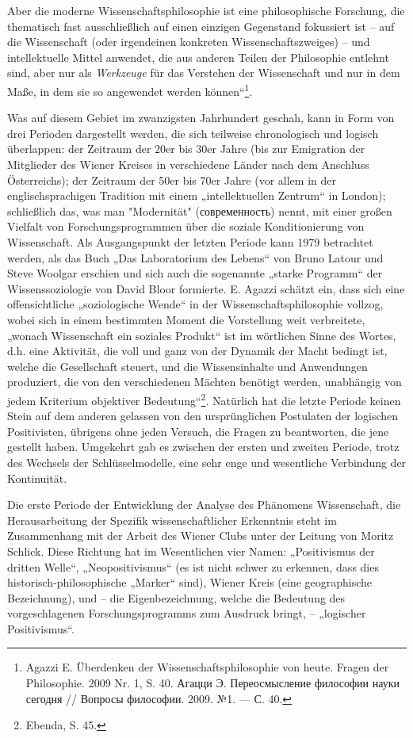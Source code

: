 \documentclass[11pt,a4paper]{article}
\begin{document}
Aber die moderne Wissenschaftsphilosophie ist eine philosophische Forschung,
die thematisch fast ausschließlich auf einen einzigen Gegenstand fokussiert
ist -- auf die Wissenschaft (oder irgendeinen konkreten Wissenschaftszweiges)
-- und intellektuelle Mittel anwendet, die aus anderen Teilen der Philosophie
entlehnt sind, aber nur als \emph{Werkzeuge} für das Verstehen der
Wissenschaft und nur in dem Maße, in dem sie so angewendet werden
können“\footnote{Agazzi E. Überdenken der Wissenschaftsphilosophie von heute.
  Fragen der Philosophie. 2009 Nr. 1, S. 40. \foreignlanguage{russian}{Агацци
    Э.  Переосмысление философии науки сегодня // Вопросы философии. 2009.
    №1. — С. 40.}}.

Was auf diesem Gebiet im zwanzigsten Jahrhundert geschah, kann in Form von
drei Perioden dargestellt werden, die sich teilweise chronologisch und logisch
überlappen: der Zeitraum der 20er bis 30er Jahre (bis zur Emigration der
Mitglieder des Wiener Kreises in verschiedene Länder nach dem Anschluss
Österreichs); der Zeitraum der 50er bis 70er Jahre (vor allem in der
englischsprachigen Tradition mit einem „intellektuellen Zentrum“ in London);
schließlich das, was man "Modernität"
(\foreignlanguage{russian}{современность}) nennt, mit einer großen Vielfalt
von Forschungsprogrammen über die soziale Konditionierung von Wissenschaft.
Als Ausgangspunkt der letzten Periode kann 1979 betrachtet werden, als das
Buch „Das Laboratorium des Lebens“ von Bruno Latour und Steve Woolgar erschien
und sich auch die sogenannte „starke Programm“ der Wissenssoziologie von David
Bloor formierte. E. Agazzi schätzt ein, dass sich eine offensichtliche
„soziologische Wende“ in der Wissenschaftsphilosophie vollzog, wobei sich in
einem bestimmten Moment die Vorstellung weit verbreitete, „wonach Wissenschaft
ein soziales Produkt“ ist im wörtlichen Sinne des Wortes, d.h. eine Aktivität,
die voll und ganz von der Dynamik der Macht bedingt ist, welche die
Gesellschaft steuert, und die Wissensinhalte und Anwendungen produziert, die
von den verschiedenen Mächten benötigt werden, unabhängig von jedem Kriterium
objektiver Bedeutung“\footnote{Ebenda, S. 45.}. Natürlich hat die letzte
Periode keinen Stein auf dem anderen gelassen von den ursprünglichen
Postulaten der logischen Positivisten, übrigens ohne jeden Versuch, die Fragen
zu beantworten, die jene gestellt haben.  Umgekehrt gab es zwischen der ersten
und zweiten Periode, trotz des Wechsels der Schlüsselmodelle, eine sehr enge
und wesentliche Verbindung der Kontinuität.

Die erste Periode der Entwicklung der Analyse des Phänomens Wissenschaft, die
Herausarbeitung der Spezifik wissenschaftlicher Erkenntnis steht im
Zusammenhang mit der Arbeit des Wiener Clubs unter der Leitung von Moritz
Schlick.  Diese Richtung hat im Wesentlichen vier Namen: „Positivismus der
dritten Welle“, „Neopositivismus“ (es ist nicht schwer zu erkennen, dass dies
historisch-philosophische „Marker“ sind), Wiener Kreis (eine geographische
Bezeichnung), und -- die Eigenbezeichnung, welche die Bedeutung des
vorgeschlagenen Forschungsprogramms zum Ausdruck bringt, -- „logischer
Positivismus“.
\end{document}
